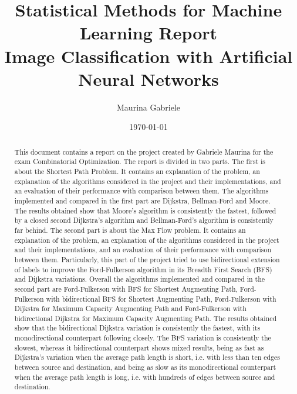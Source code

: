 \documentclass{article}
\title{Statistical Methods for Machine Learning Report\\[1ex]
\large Image Classification with Artificial Neural Networks}
\author{Maurina Gabriele}
\date{\today}
\begin{document}
\begin{titlepage}
\maketitle
\end{titlepage}

\begin{abstract}
This document contains a report on the project created by Gabriele Maurina for the exam Combinatorial Optimization.
The report is divided in two parts. The first is about the Shortest Path Problem. It contains an explanation of the problem,
an explanation of the algorithms considered in the project and their implementations, and an evaluation of their performance
with comparison between them. The algorithms implemented and compared in the first part are Dijkstra, Bellman-Ford and Moore.
The results obtained show that Moore's algorithm is consistently the fastest, followed by a closed second Dijkstra's algorithm
and Bellman-Ford's algorithm is consistently far behind.
The second part is about the Max Flow problem. It contains an explanation of the problem, an explanation of the algorithms considered in the project and
their implementations, and an evaluation of their performance with comparison between them. Particularly, this part of the project tried to
use bidirectional extension of labels to improve the Ford-Fulkerson algorithm in its Breadth First Search (BFS) and Dijkstra variations. Overall the algorithms implemented
and compared in the second part are Ford-Fulkerson with BFS for Shortest Augmenting Path, Ford-Fulkerson with bidirectional BFS for Shortest Augmenting Path,
Ford-Fulkerson with Dijkstra for Maximum Capacity Augmenting Path and Ford-Fulkerson with bidirectional Dijkstra for Maximum Capacity Augmenting Path.
The results obtained show that the bidirectional Dijkstra variation is consistently the fastest, with its monodirectional counterpart following closely.
The BFS variation is consistently the slowest, whereas it bidirectional counterpart shows mixed results, being as fast as Dijkstra's variation
when the average path length is short, i.e. with less than ten edges between source and destination, and being as slow as its monodirectional
counterpart when the average path length is long, i.e. with hundreds of edges between source and destination.
\end{abstract}

\tableofcontents

%
%
%
\end{document}
